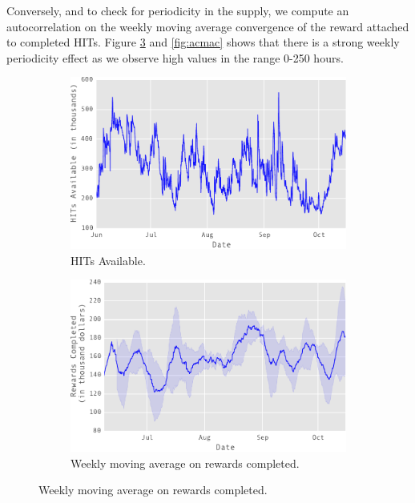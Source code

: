 Conversely, and to check for periodicity in the supply, we compute an autocorrelation on the weekly moving average convergence of the reward attached to completed HITs. Figure \ref{fig:mac} and \ref{fig:acmac} shows that there is a strong weekly periodicity effect as we observe high values in the range 0-250 hours.

\begin{figure}[t!]
    \centering
    \begin{subfigure}[b]{0.48\textwidth}
        \centering
        \includegraphics[width=\textwidth]{figures/out}
        \caption{HITs Available.}
        \label{fig:hitav}
    \end{subfigure}
    \hfill
    \begin{subfigure}[b]{0.48\textwidth}
        \centering
        \includegraphics[width=\textwidth]{figures/mac}
        \caption{Weekly moving average on rewards completed.}
        \label{fig:mac}
    \end{subfigure}
    \hfill

\end{figure}
